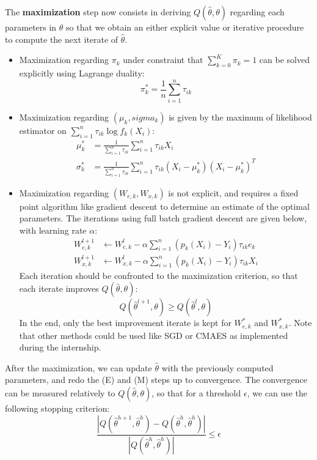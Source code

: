 The \textbf{maximization} step now consists in deriving $Q(\widehat{\theta}, \theta)$ regarding each parameters in $\theta$
so that we obtain an either explicit value or iterative procedure to compute the next iterate of $\widehat{\theta}$.
\begin{itemize}
    \item Maximization regarding $\pi_k$ under constraint that $\sum_{k=0}^K \pi_k = 1$ can be solved explicitly using Lagrange duality:
    $$
    \pi_k^* = \frac{1}{n} \sum_{i=1}^n \tau_{ik}
    $$
    \item Maximization regarding $(\mu_k, sigma_k)$ is given by the maximum of likelihood estimator on $\sum_{i=1}^n \tau_{ik} \log f_{k}(X_i)$:
    $$
    \begin{align}
        \mu_k^* &= \frac{1}{\sum_{i=1}^n \tau_{ik}} \sum_{i=1}^n \tau_{ik} X_i \\
        \sigma_k^* &= \frac{1}{\sum_{i=1}^n \tau_{ik}} \sum_{i=1}^n \tau_{ik} (X_i - \mu_k^*)(X_i - \mu_k^*)^T
    \end{align}
    $$
    \item Maximization regarding $(W_{e,k}, W_{x,k})$ is not explicit, and requires a fixed point algorithm like gradient descent to determine an estimate of the optimal parameters.
    The iterations using full batch gradient descent are given below, with learning rate $\alpha$:
    $$
    \begin{align}
        W_{e,k}^{l+1} &\leftarrow W_{e,k}^{l} - \alpha \sum_{i=1}^n (p_k(X_i) - Y_i) \tau_{ik} e_k \\
        W_{x,k}^{l+1} &\leftarrow  W_{x,k}^{l} - \alpha \sum_{i=1}^n (p_k(X_i) - Y_i) \tau_{ik} X_i
    \end{align}
    $$
    Each iteration should be confronted to the maximization criterion, so that each iterate improves $Q(\widehat{\theta}, \theta)$:
    $$
    Q(\widehat{\theta}^{l+1}, \theta) \geq Q(\widehat{\theta}^{l}, \theta)
    $$
    In the end, only the best improvement iterate is kept for $W_{e,k}^*$ and $W_{x,k}^*$. Note that other methods could be used like SGD or CMAES as implemented during the internship.
\end{itemize}

After the maximization, we can update $\widehat{\theta}$ with the previously computed parameters, and redo the (E) and (M) steps up to convergence.
The convergence can be measured relatively to $ Q(\widehat{\theta}, \theta)$, so that for a threshold $\epsilon$, we can use the following stopping criterion:
$$
\frac{|Q(\widehat{\theta}^{h+1}, \widehat{\theta}^{h}) - Q(\widehat{\theta}^{h}, \widehat{\theta}^{h})|}{|Q(\widehat{\theta}^{h}, \widehat{\theta}^{h})|} \leq \epsilon
$$

